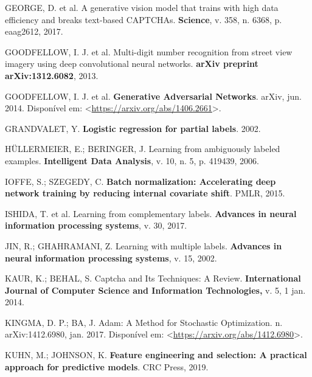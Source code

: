 \documentclass[12pt,twoside,brazilian]{book}
\newlength{\cslhangindent}
\newlength{\cslentryspacingunit} %
\newenvironment{CSLReferences}[2] %
 {%
  \setlength{\parindent}{0pt}
  \ifodd #1
  \let\oldpar\par
  \def\par{\hangindent=\cslhangindent\oldpar}
  \fi
  \setlength{\parskip}{#2\cslentryspacingunit}
 }%
 {}
\begin{document}
\begin{CSLReferences}{0}{1}
\leavevmode{}%
GEORGE, D. et al. A generative vision model that trains with high data
efficiency and breaks text-based CAPTCHAs. \textbf{Science}, v. 358, n.
6368, p. eaag2612, 2017.

\leavevmode{}%
GOODFELLOW, I. J. et al. Multi-digit number recognition from street view
imagery using deep convolutional neural networks. \textbf{arXiv preprint
arXiv:1312.6082}, 2013.

\leavevmode{}%
GOODFELLOW, I. J. et al. \textbf{Generative {Adversarial Networks}}.
{arXiv}, jun. 2014. Disponível em:
\textless{}\url{https://arxiv.org/abs/1406.2661}\textgreater.

\leavevmode{}%
GRANDVALET, Y. \textbf{Logistic regression for partial labels}. 2002.

\leavevmode{}%
HÜLLERMEIER, E.; BERINGER, J. Learning from ambiguously labeled
examples. \textbf{Intelligent Data Analysis}, v. 10, n. 5, p. 419439,
2006.

\leavevmode{}%
IOFFE, S.; SZEGEDY, C. \textbf{Batch normalization: Accelerating deep
network training by reducing internal covariate shift}. PMLR, 2015.

\leavevmode{}%
ISHIDA, T. et al. Learning from complementary labels. \textbf{Advances
in neural information processing systems}, v. 30, 2017.

\leavevmode{}%
JIN, R.; GHAHRAMANI, Z. Learning with multiple labels. \textbf{Advances
in neural information processing systems}, v. 15, 2002.

\leavevmode{}%
KAUR, K.; BEHAL, S. Captcha and Its Techniques: A Review.
\textbf{International Journal of Computer Science and Information
Technologies,} v. 5, 1 jan. 2014.

\leavevmode{}%
KINGMA, D. P.; BA, J. Adam: {A Method} for {Stochastic Optimization}. n.
arXiv:1412.6980, jan. 2017. Disponível em:
\textless{}\url{https://arxiv.org/abs/1412.6980}\textgreater.

\leavevmode{}%
KUHN, M.; JOHNSON, K. \textbf{Feature engineering and selection: A
practical approach for predictive models}. CRC Press, 2019.


\end{CSLReferences}
\end{document}
